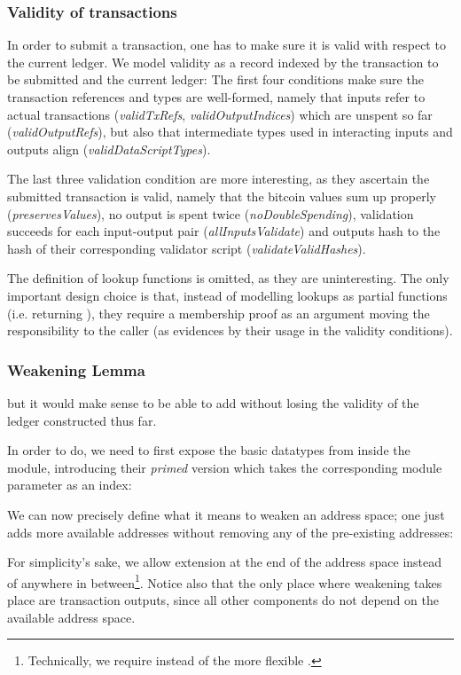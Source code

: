 \documentclass[acmsmall,nonacm=true,screen=true]{acmart}
\begin{document}
\subsubsection{Validity of transactions}
In order to submit a transaction, one has to make sure it is valid with respect to the current ledger.
We model validity as a record indexed by the transaction to be submitted and the current ledger:
\UTXOvalid{}
The first four conditions make sure the transaction references and types are well-formed, namely that
inputs refer to actual transactions (\textit{validTxRefs}, \textit{validOutputIndices})
which are unspent so far (\textit{validOutputRefs}), but also that intermediate types used in interacting
inputs and outputs align (\textit{validDataScriptTypes}).

The last three validation condition are more interesting, as they ascertain the submitted transaction is valid,
namely that the bitcoin values sum up properly (\textit{preservesValues}), no output is spent twice (\textit{noDoubleSpending}),
validation succeeds for each input-output pair (\textit{allInputsValidate}) and outputs hash to the hash of their corresponding 
validator script (\textit{validateValidHashes}).

The definition of lookup functions is omitted, as they are uninteresting. The only important design choice is that,
instead of modelling lookups as partial functions (i.e. returning \inlineMaybe{}), they require a membership
proof as an argument moving the responsibility to the caller (as evidences by their usage in the validity conditions).

\subsubsection{Weakening Lemma}

but it would make sense to be able to add 
without losing the validity of the ledger constructed thus far.

In order to do, we need to first expose the basic datatypes from inside the module,
introducing their \textit{primed} version which takes the corresponding module parameter as an index:

\UTXOprimedTypes{}

We can now precisely define what it means to weaken an address space; one just adds more available
addresses without removing any of the pre-existing addresses:

\UTXOweaken{}
For simplicity's sake, we allow extension at the end of the address space instead of anywhere in
between\footnote{Technically, we require \inlinePrefix{} instead of the more flexible \inlineSubset{}.}.
Notice also that the only place where weakening takes place are transaction outputs, since all other
components do not depend on the available address space.
\end{document}
